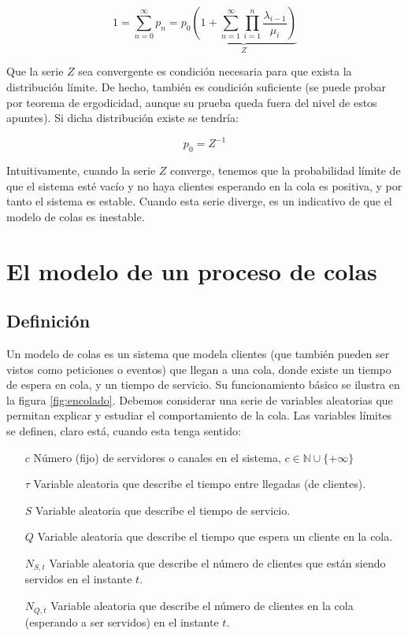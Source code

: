 \documentclass[a4paper,10pt]{scrartcl}
\theoremstyle{definition}
\numberwithin{equation}{section}
\begin{document}
	\begin{equation}
	1 = \sum_{n=0}^{\infty} p_n = p_0 \underbrace{\left(1 + \sum_{n=1}^{\infty} \prod_{i=1}^n \frac{\lambda_{i-1}}{\mu_i} \right)}_{Z}
	\label{eq:stabseries}
	\end{equation}
	
	Que la serie $Z$ sea convergente es condición necesaria para que exista la distribución límite. 
	De hecho, también es condición suficiente (se puede probar por teorema de ergodicidad, aunque su prueba queda
	fuera del nivel de estos apuntes). Si dicha distribución existe se tendría: 
	
	\begin{equation}
	p_0 = Z^{-1} 
	\label{eq:relp0}
	\end{equation}
	
	Intuitivamente, cuando la serie $Z$ converge, tenemos que la probabilidad límite de que el 
	sistema esté vacío y no haya clientes esperando en la cola es positiva, y por tanto el sistema 
        es estable. Cuando esta serie diverge, es un indicativo de que el modelo de colas
	es inestable.
	
	
	\section{El modelo de un proceso de colas}
	\subsection{Definición}
	Un modelo de colas es un sistema que modela clientes (que también pueden ser vistos como peticiones o eventos) que llegan a una cola,
	donde existe un tiempo de espera en cola, y un tiempo de servicio. Su funcionamiento básico se 
	ilustra en la figura \ref{fig:encolado}. Debemos considerar una serie de variables aleatorias que permitan
	explicar y estudiar el comportamiento de la cola. Las variables límites se definen, claro está, cuando esta 
	tenga sentido:
	
	\begin{itemize}
		\item [$c$]
		Número (fijo) de servidores o canales en el sistema, $c\in \mathbb{N} \cup \{+\infty\}$
		\item [$\tau$]
		Variable aleatoria que describe el tiempo entre llegadas (de clientes).
		\item [$S$]
		Variable aleatoria que describe el tiempo de servicio.
		\item [$Q$]
		Variable aleatoria que describe el tiempo que espera un cliente en la cola.
		\item [$N_{S,t}$]
		Variable aleatoria que describe el número de clientes que están siendo servidos en el instante $t$.
		\item [$N_{Q,t}$]
		Variable aleatoria que describe el número de clientes en la cola (esperando a ser servidos) en el instante $t$.
	\end{itemize}
	
\end{document}
